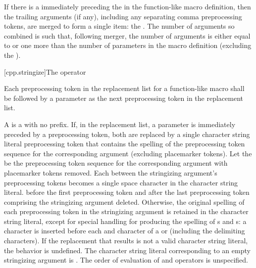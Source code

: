 \documentclass{wg21}
\newcommand{\cwhitespaces}[1]{\removed{#1} \added{\grammarterm{whitespace}{s}}}
\begin{document}
\pnum
{}%
If there is a  immediately preceding the \tcode{)} in the
function-like macro
definition, then the trailing arguments (if any), including any separating comma preprocessing
tokens, are merged to form a single item: the . The number of
arguments so combined is such that, following merger, the number of arguments is
either equal to or
one more than the number of parameters in the macro definition (excluding the
).

[cpp.stringize]{The \tcode{\#} operator}%
%

\pnum
Each
\tcode{\#}
preprocessing token in the replacement list for a function-like
macro shall be followed by a parameter as the next preprocessing
token in the replacement list.

\pnum
A  is a  with no prefix.
If, in the replacement list, a parameter is immediately
preceded by a
\tcode{\#}
preprocessing token,
both are replaced by a single character string literal preprocessing token that
contains the spelling of the preprocessing token sequence for the
corresponding argument (excluding placemarker tokens).
Let the  be the preprocessing token sequence
for the corresponding argument with placemarker tokens removed.
Each  between the stringizing argument's preprocessing
tokens becomes a single space character in the character string literal.
 \cwhitespaces{whitespace} before the first preprocessing token and after the last
preprocessing token comprising the stringizing argument  deleted.
Otherwise, the original spelling of each preprocessing token in the
stringizing argument is retained in the character string literal,
except for special handling for producing the spelling of
s and s:
a
\tcode{\textbackslash}
character is inserted before each
and
\tcode{\textbackslash}
character of a  or 
(including the delimiting
characters).
If the replacement that results is not a valid character string literal,
the behavior is undefined. The character string literal corresponding to
an empty stringizing argument is .
The order of evaluation of
\tcode{\#}
and
\tcode{\#\#}
operators is unspecified.
\end{document}
